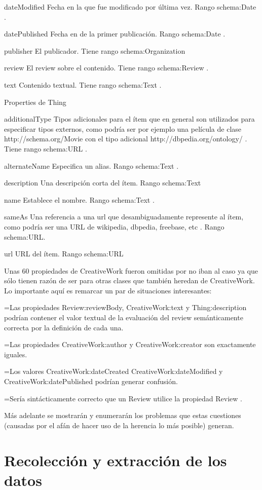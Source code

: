 dateModified 	Fecha en la que fue modificado por última vez. Rango schema:Date .

datePublished 	Fecha en de la primer publicación. Rango schema:Date .

publisher 	El publicador. Tiene rango schema:Organization

review 	 	El review sobre el contenido. Tiene rango schema:Review .

text 		Contenido textual. Tiene rango schema:Text .


Properties de Thing

additionalType 	 Tipos adicionales para el ítem que en general son utilizados para especificar tipos externos, como podría ser por ejemplo una película de clase http://schema.org/Movie con el tipo adicional  http://dbpedia.org/ontology/ . Tiene rango schema:URL .

alternateName 	 Especifica un alias. Rango schema:Text .

description 	Una descripción corta del ítem. Rango schema:Text 

name 		Establece el nombre. Rango schema:Text .

sameAs 		Una referencia a una url que desambiguadamente represente al ítem, como podría ser una URL de wikipedia, dbpedia, freebase, etc . Rango schema:URL.

url 		URL del ítem. Rango schema:URL

Unas 60 propiedades de CreativeWork fueron omitidas por no iban al caso ya que sólo tienen razón de ser para otras clases que 
también heredan de CreativeWork. Lo importante aquí es remarcar un par de situaciones interesantes:

=Las propiedades Review:reviewBody, CreativeWork:text y Thing:description podrían contener el valor textual de la evaluación del review semánticamente correcta por la definición de cada una.

=Las propiedades CreativeWork:author y CreativeWork:creator son exactamente iguales. 

=Los valores CreativeWork:dateCreated CreativeWork:dateModified y CreativeWork:datePublished podrían generar confusión. 

=Sería sintácticamente correcto que un Review utilice la propiedad Review .

Más adelante se mostrarán y enumerarán los problemas que estas cuestiones (causadas por el afán de hacer uso de la herencia
lo más posible)  generan. 


\section{Recolección y extracción de los datos}

